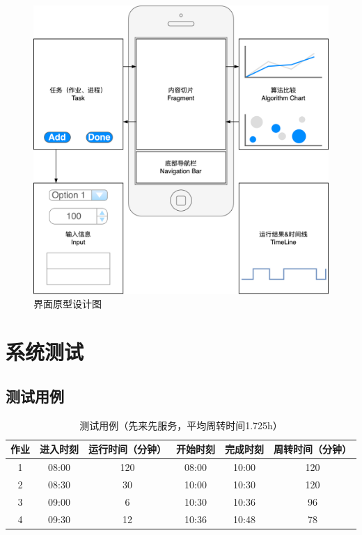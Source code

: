 \documentclass[UTF8]{ctexart}
\begin{document}
\begin{figure}[htbp]
    \centering
    \includegraphics[scale=0.09]{i-prototype.png}
    \caption{界面原型设计图}
\end{figure}

\section{系统测试}

\subsection{测试用例}

\begin{table}[htbp]
    \caption{测试用例（先来先服务，平均周转时间1.725h）}
    \centering
    \begin{tabular}{cccccc}
        \toprule
        作业 & 进入时刻  & 运行时间（分钟） & 开始时刻  & 完成时刻  & 周转时间（分钟） \\
        \midrule
        1  & 08:00 & 120      & 08:00 & 10:00 & 120      \\
        2  & 08:30 & 30       & 10:00 & 10:30 & 120      \\
        3  & 09:00 & 6        & 10:30 & 10:36 & 96       \\
        4  & 09:30 & 12       & 10:36 & 10:48 & 78       \\
        \bottomrule
    \end{tabular}
    \qquad
\end{table}
\end{document}
